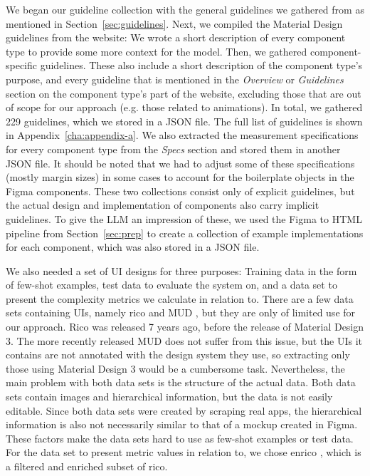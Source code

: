 \documentclass[11pt,titlepage,oneside,openany]{book}
\begin{document}
We began our guideline collection with the general guidelines we gathered from \cite{johnson_designing_2020} as mentioned in Section~\ref{sec:guidelines}. Next, we compiled the Material Design guidelines from the website: We wrote a short description of every component type to provide some more context for the model. Then, we gathered component-specific guidelines. These also include a short description of the component type's purpose, and every guideline that is mentioned in the \emph{Overview} or \emph{Guidelines} section on the component type's part of the website, excluding those that are out of scope for our approach (e.g. those related to animations). In total, we gathered 229 guidelines, which we stored in a JSON file. The full list of guidelines is shown in Appendix~\ref{cha:appendix-a}. We also extracted the measurement specifications for every component type from the \emph{Specs} section and stored them in another JSON file. It should be noted that we had to adjust some of these specifications (mostly margin sizes) in some cases to account for the boilerplate objects in the Figma components. These two collections consist only of explicit guidelines, but the actual design and implementation of components also carry implicit guidelines. To give the LLM an impression of these, we used the Figma to HTML pipeline from Section~\ref{sec:prep} to create a collection of example implementations for each component, which was also stored in a JSON file.

We also needed a set of UI designs for three purposes: Training data in the form of few-shot examples, test data to evaluate the system on, and a data set to present the complexity metrics we calculate in relation to. There are a few data sets containing UIs, namely rico \cite{deka_rico_2017} and MUD \cite{feng_mud_2024}, but they are only of limited use for our approach. Rico was released 7 years ago, before the release of Material Design 3. The more recently released MUD does not suffer from this issue, but the UIs it contains are not annotated with the design system they use, so extracting only those using Material Design 3 would be a cumbersome task. Nevertheless, the main problem with both data sets is the structure of the actual data. Both data sets contain images and hierarchical information, but the data is not easily editable. Since both data sets were created by scraping real apps, the hierarchical information is also not necessarily similar to that of a mockup created in Figma. These factors make the data sets hard to use as few-shot examples or test data. For the data set to present metric values in relation to, we chose enrico \cite{leiva_enrico_2021}, which is a filtered and enriched subset of rico. 
\end{document}
